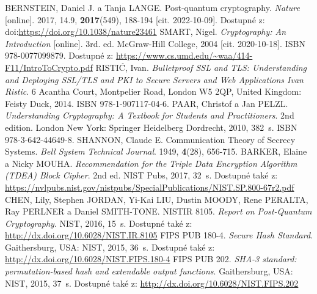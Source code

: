 

\begin{thebibliography}{99}
  BERNSTEIN, Daniel J. a Tanja LANGE. Post-quantum cryptography. \textit{Nature} [online]. 2017, 14.9, \textbf{2017}(549), 188-194 [cit. 2022-10-09]. Dostupné z: doi:\url{https://doi.org/10.1038/nature23461}
  SMART, Nigel. \textit{Cryptography: An Introduction} [online]. 3rd. ed. McGraw-Hill College, 2004 [cit. 2020-10-18]. ISBN 978-0077099879. Dostupné z: \url{https://www.cs.umd.edu/~waa/414-F11/IntroToCrypto.pdf}
  RISTIĆ, Ivan. \textit{Bulletproof SSL and TLS: Understanding and Deploying SSL/TLS and PKI to Secure Servers and Web Applications Ivan Ristic}. 6 Acantha Court, Montpelier Road, London W5 2QP, United Kingdom: Feisty Duck, 2014. ISBN 978-1-907117-04-6.
  PAAR, Christof a Jan PELZL. \textit{Understanding Cryptography: A Textbook for Students and Practitioners}. 2nd edition. London New York: Springer Heidelberg Dordrecht, 2010, 382~s. ISBN 978-3-642-44649-8.
  SHANNON, Claude E. Communication Theory of Secrecy Systems. \textit{Bell System Technical Journal}. 1949, \textbf{4}(28), 656-715.
  BARKER, Elaine a Nicky MOUHA. \textit{Recommendation for the Triple Data Encryption Algorithm (TDEA) Block Cipher}. 2nd ed. NIST Pubs, 2017, 32~s. Dostupné také z: \url{https://nvlpubs.nist.gov/nistpubs/SpecialPublications/NIST.SP.800-67r2.pdf}
  CHEN, Lily, Stephen JORDAN, Yi-Kai LIU, Dustin MOODY, Rene PERALTA, Ray PERLNER a Daniel SMITH-TONE. NISTIR 8105. \textit{Report on Post-Quantum Cryptography}. NIST, 2016, 15~s. Dostupné také z: \url{http://dx.doi.org/10.6028/NIST.IR.8105}
  FIPS PUB 180-4. \textit{Secure Hash Standard}. Gaithersburg, USA: NIST, 2015, 36~s. Dostupné také z: \url{http://dx.doi.org/10.6028/NIST.FIPS.180-4}
  FIPS PUB 202. \textit{SHA-3 standard: permutation-based hash and extendable output functions}. Gaithersburg, USA: NIST, 2015, 37~s. Dostupné také z: \url{http://dx.doi.org/10.6028/NIST.FIPS.202}

\end{thebibliography}

